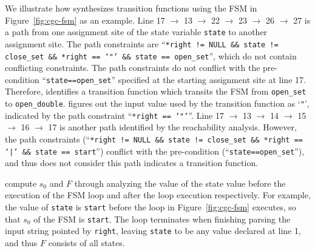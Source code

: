 We illustrate how \Tool{} synthesizes transition functions using 
the FSM in Figure~\ref{fig:cgc-fsm} as an example. 
Line 17 $\rightarrow$ 13 $\rightarrow$ 22 $\rightarrow$ 23 $\rightarrow$ 26 $\rightarrow$ 27
is a path from one assignment site of the state variable \texttt{state} 
to another assignment site. 
The path constraints are 
``\texttt{*right != NULL \&\& state != close\_set \&\& *right == `"' \&\& state == open\_set}'', 
which do not contain conflicting constraints. 
The path constraints do not conflict with the pre-condition ``\texttt{state==open\_set}'' 
specified at the starting assignment site at line 17.
Therefore, \Tool{} identifies a transition function which transits the FSM from  
\texttt{open\_set} to \texttt{open\_double}. 
\Tool{} figures out the input value used by the 
transition function as `\texttt{"}', 
indicated by the path 
constraint ``\texttt{*right == `"'}''.  
Line 17 $\rightarrow$ 13 $\rightarrow$ 14 $\rightarrow$ 15 
$\rightarrow$ 16 $\rightarrow$ 17
is another path identified by the reachability analysis. 
However, the path constraints (``\texttt{*right != NULL \&\& state != close\_set \&\& *right == `|' \&\& state == start}'') 
conflict 
with the pre-condition (``\texttt{state==open\_set}''), 
and thus \Tool{} does not consider this path indicates a transition function. 



\Tool{} compute $s_0$ and $F$ through analyzing the value of 
the state value before the execution of the 
FSM loop and after the loop execution respectively. 
For example, the value of \texttt{state} is \texttt{start} before the loop in Figure~\ref{fig:cgc-fsm} executes, 
so that $s_0$ of the FSM is \texttt{start}.
The loop terminates when finishing 
parsing the input string pointed by \texttt{right},
leaving \texttt{state} to be any value declared at line 1, 
and thus $F$ consists of all states. 







